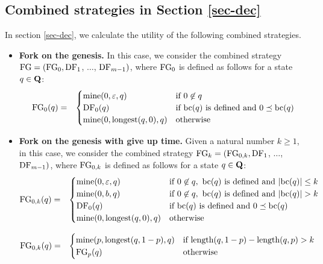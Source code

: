 \subsection{Combined strategies in Section \ref{sec-dec}}
In section \ref{sec-dec}, we calculate the utility of the following combined strategies.
\begin{itemize}
\item {\bf Fork on the genesis.} In this case, we consider the combined strategy $\text{\rm FG} = (\text{\rm FG}_0, \text{\rm DF}_1$, $\ldots$, $\text{\rm DF}_{m-1})$, where $\text{\rm FG}_0$ is defined as follows for a state $q \in \mathbf{Q}$:
\begin{eqnarray*}
\text{\rm FG}_0(q) & = &
\begin{cases}
\text{\rm mine}(0,\varepsilon,q) & \text{if } 0 \not\in q\\
\text{\rm DF}_0(q) & \text{if } \text{bc}(q) \text{ is defined and } 0 \preceq \text{bc}(q)\\
\text{\rm mine}(0,{\text{\rm longest}}(q,0),q) &  \text{otherwise}
\end{cases}
\end{eqnarray*}

\item {\bf Fork on the genesis with give up time.} Given a natural number $k \geq 1$, in this case, we consider the combined strategy $\text{\rm FG}_k = (\text{\rm FG}_{0,k}, \text{\rm DF}_1$, $\ldots$, $\text{\rm DF}_{m-1})$, where $\text{\rm FG}_{0,k}$ is defined as follows for a state $q \in \mathbf{Q}$:
\begin{eqnarray*}
\text{\rm FG}_{0,k}(q) & = &
\begin{cases}
\text{\rm mine}(0,\varepsilon,q) & \text{if } 0 \not\in q,\ \text{bc}(q) \text{ is defined and } |\text{bc}(q)| \leq k\\
\text{\rm mine}(0,b,q) & \text{if } 0 \not\in q,\ \text{bc}(q) \text{ is defined and } |\text{bc}(q)| > k\\
\text{\rm DF}_0(q) & \text{if } \text{bc}(q) \text{ is defined and } 0 \preceq \text{bc}(q)\\
\text{\rm mine}(0,{\text{\rm longest}}(q,0),q) &  \text{otherwise}
\end{cases}
\end{eqnarray*}

\begin{eqnarray*}
\text{\rm FG}_{0,k}(q) & = &
\begin{cases}
\text{\rm mine}(p,{\text{\rm longest}}(q,1-p),q) & \text{if } \text{\rm length}(q,1-p) - \text{\rm length}(q,p) > k\\
\text{\rm FG}_p(q) &   \text{otherwise}
\end{cases}
\end{eqnarray*}
\end{itemize}


